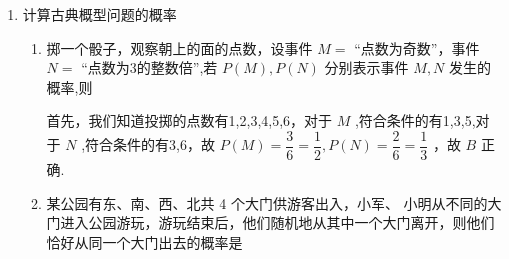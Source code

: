 \begin{enumerate}
\begin{enumerate}
\begin{jieda}
            “两枚硬币一枚正面向上，另一枚反面向上” 包含的基本事件有\{正，反\}、\{反，正\}共两个，故 D 错.
        \end{jieda}
        
        \item 有 5 根木棍，其长度分别为 2, 3, 4, 5, 6，从这 5 根木棍中任取 3 根，首尾相接能构成三角形的有个.
        \begin{jieda}
            根据三角形任意两边之和大于第三边，所以能组成三角形的有: 2, 3, 4; 2, 4, 5; 2, 5, 6; 3, 4, 5; 3, 4, 6; 3, 5, 6; 4, 5, 6, 共 7 个
        \end{jieda}
        
        \item 一个箱子中装有编号分别为 1、2、3、4、5的 5 个小球， 5 个小球除编号外其他均无异，现有事件 $A$ 为“从箱中任取 3 个小球观察其编号”，问事件 $A$ 的样本点数有个.
        \begin{jieda}
            因为事件 $A$ 为“从箱中任取 3 个小球观察其编号”，则事件 $A$ 包含的样本点有 $\left( {1,2,3}\right) ,\left( {1,2,4}\right) ,\left( {1,2,5}\right) ,\left( {1,3,4}\right) ,\left( {1,3,5}\right) ,\left( {1,4,5}\right) ,\left( {2,3,4}\right)$, $\left( {2,3,5}\right) ,\left( {2,4,5}\right) ,\left( {3,4,5}\right)$ 共 10 种.
        \end{jieda}
    \end{enumerate}

    \item 计算古典概型问题的概率
    \begin{enumerate}
        \item 掷一个骰子，观察朝上的面的点数，设事件 $M =$ “点数为奇数”，事件 $N{ = }$ “点数为3的整数倍”,若 $P\left( M\right) ,P\left( N\right)$ 分别表示事件 $M,N$ 发生的概率,则
        \begin{jieda}
            首先，我们知道投掷的点数有1,2,3,4,5,6，对于 $M$ ,符合条件的有1,3,5,对于 $N$ ,符合条件的有3,6，故 $P\left( M\right)  = \dfrac{3}{6} = \dfrac{1}{2},P\left( N\right)  = \dfrac{2}{6} = \dfrac{1}{3}$ ，故 ${B}$ 正确.
        \end{jieda}

        \item 某公园有东、南、西、北共 4 个大门供游客出入，小军、 小明从不同的大门进入公园游玩，游玩结束后，他们随机地从其中一个大门离开，则他们恰好从同一个大门出去的概率是
        

\end{enumerate}
\end{enumerate}
